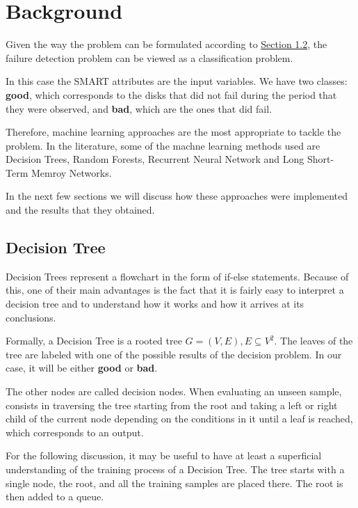 \chapter{Background}\label{chap:background}

Given the way the problem can be formulated according to \hyperref[sec:problem]{Section 1.2}, the failure detection problem can be viewed as a classification problem.

In this case the SMART attributes are the input variables.
We have two classes: \textbf{good}, which corresponds to the disks that did not fail during the period that they were observed, and \textbf{bad}, which are the ones that did fail.  

Therefore, machine learning approaches are the most appropriate to tackle the problem.
In the literature, some of the machne learning methods used are Decision Trees, Random Forests, Recurrent Neural Network and Long Short-Term Memroy Networks.

In the next few sections we will discuss how these approaches were implemented and the results that they obtained.

\section{Decision Tree}\label{sec:decisiontree}

Decision Trees represent a flowchart in the form of if-else statements.
Because of this, one of their main advantages is the fact that it is fairly easy to interpret a decision tree and to understand how it works and how it arrives at its conclusions.

Formally, a Decision Tree is a rooted tree $G = (V, E), E \subseteq V^2$.
The leaves of the tree are labeled with one of the possible results of the decision problem.
In our case, it will be either \textbf{good} or \textbf{bad}.

The other nodes are called decision nodes.
When evaluating an unseen sample, consists in traversing the tree starting from the root and taking a left or right child of the current node depending on the conditions in it until a leaf is reached, which corresponds to an output.

For the following discussion, it may be useful to have at least a superficial understanding of the training process of a Decision Tree.
The tree starts with a single node, the root, and all the training samples are placed there.
The root is then added to a queue.

